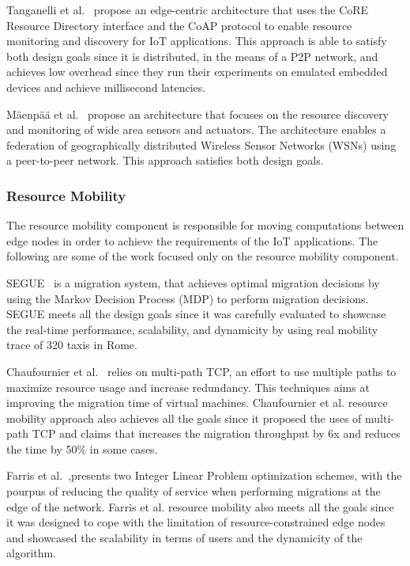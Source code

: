 Tanganelli et al.~\cite{8086146} propose an edge-centric architecture that uses the CoRE Resource Directory interface and the CoAP protocol to enable resource monitoring and discovery for IoT applications. This approach is able to satisfy both design goals since it is distributed, in the means of a P2P network, and achieves low overhead since they run their experiments on emulated embedded devices and achieve millisecond latencies.

M{\"a}enp{\"a}{\"a} et al.~\cite{Maenpaa2012} propose an architecture that focuses on the resource discovery and monitoring of wide area sensors and actuators. The architecture enables a federation of geographically distributed Wireless Sensor Networks (WSNs)  using a peer-to-peer network. This approach satisfies both design goals.

\subsubsection{Resource Mobility}
The resource mobility component is responsible for moving computations between edge nodes in order to achieve the requirements of the IoT applications. The following are some of the work focused only on the resource mobility component.

SEGUE~\cite{SEGUE} is a migration system, that achieves optimal migration decisions by using the Markov Decision Process (MDP) to perform migration decisions. SEGUE meets all the design goals since it was carefully evaluated to showcase the real-time performance, scalability, and dynamicity by using real mobility trace of 320 taxis in Rome. 

Chaufournier et al.~\cite{Chaufournier:2017} relies on multi-path TCP, an effort to use multiple paths to maximize resource usage and increase redundancy. This techniques aims at improving the migration time of virtual machines. Chaufournier et al. resource mobility approach also achieves all the goals since it proposed the uses of multi-path TCP and claims that increases the migration throughput by 6x and reduces the time by 50\% in some cases.

Farris et al.~\cite{Farris:2017},presents two Integer Linear Problem optimization schemes, with the pourpus of reducing the quality of service when performing migrations at the edge of the network. Farris et al. resource mobility also meets all the goals since it was designed to cope with the limitation of resource-constrained edge nodes and showcased the scalability in terms of users and the dynamicity of the algorithm.

